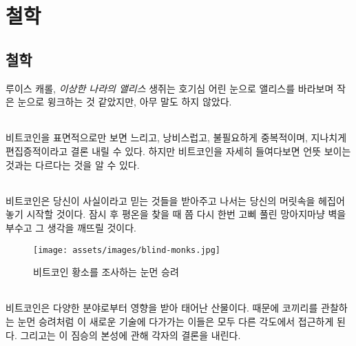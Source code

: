 \part{철학}
\label{ch:philosophy}
\chapter*{철학}

\begin{chapquote}{루이스 캐롤, \textit{이상한 나라의 앨리스}}
	생쥐는 호기심 어린 눈으로 앨리스를 바라보며 작은 눈으로 윙크하는 것 같았지만, 아무 말도 하지 않았다.
\end{chapquote}

\paragraph{}
비트코인을 표면적으로만 보면 느리고, 낭비스럽고, 불필요하게 중복적이며, 지나치게 편집증적이라고 결론 내릴 수 있다. 
하지만 비트코인을 자세히 들여다보면 언뜻 보이는 것과는 다르다는 것을 알 수 있다.

\paragraph{}
비트코인은 당신이 사실이라고 믿는 것들을 받아주고 나서는 당신의 머릿속을 헤집어 놓기 시작할 것이다.
잠시 후 평온을 찾을 때 쯤 다시 한번 고삐 풀린 망아지마냥 벽을 부수고 그 생각을 깨뜨릴 것이다.

\begin{figure}
	\texttt{[image: assets/images/blind-monks.jpg]}
	\caption{비트코인 황소를 조사하는 눈먼 승려}
	\label{fig:blind-monks}
\end{figure}

\paragraph{}
비트코인은 다양한 분야로부터 영향을 받아 태어난 산물이다.
때문에 코끼리를 관찰하는 눈먼 승려처럼 이 새로운 기술에 다가가는 이들은 모두 다른 각도에서 접근하게 된다.
그리고는 이 짐승의 본성에 관해 각자의 결론을 내린다.

